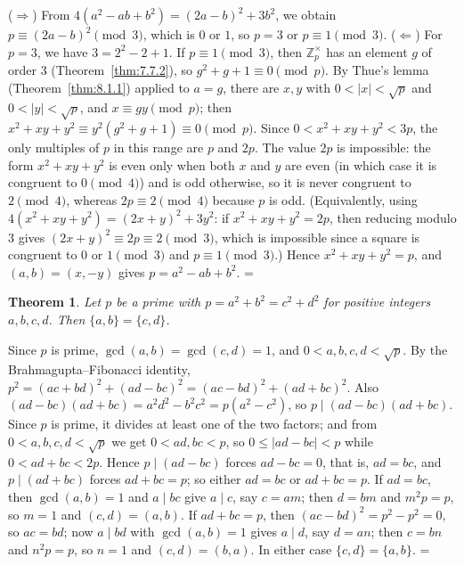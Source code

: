 \documentclass[11pt]{article}
\makeatletter
\let\nt@closedisplay\]
\def\nt@guardedclose{\@ifnextchar\par{\nt@closeafterpar}{\@ifnextchar\end{\postdisplaypenalty\@M\nt@closedisplay}{\nt@closedisplay}}}
\def\nt@closeafterpar\par{\@ifnextchar\par{\nt@closeafterpar}{\@ifnextchar\end{\postdisplaypenalty\@M\nt@closedisplay\par}{\nt@closedisplay\par}}}
\renewenvironment{proof}[1][\proofname]{\par
  \pushQED{\qed}\normalfont\topsep\medskipamount\edef\nt@afterproof{\@endparpenalty=\the\@endparpenalty\relax}\@beginparpenalty\@M\@endparpenalty\@M\let\]\nt@guardedclose\trivlist\item[]\textit{#1\@addpunct{.}} \ignorespaces}{\ifvmode\addpenalty\@M\fi\popQED\nt@afterproof\endtrivlist\@endpefalse}
\theoremstyle{ntstyle}
\newtheorem{theorem}{Theorem}[subsection]
\newcommand{\ZmodUnits}[1]{\mathbb{Z}_{#1}^{\times}}
\makeatother
\begin{document}
\begin{proof} ($\Rightarrow$) From $4(a^2 - ab + b^2) = (2a - b)^2 + 3b^2$, we obtain $p \equiv (2a - b)^2 \pmod{3}$, which is $0$ or
  $1$, so $p = 3$ or $p \equiv 1 \pmod{3}$. ($\Leftarrow$) For $p = 3$,
  we have $3 = 2^2 - 2 + 1$. If $p \equiv 1 \pmod{3}$, then
  $\ZmodUnits{p}$ has an element $g$ of order $3$ (Theorem~\ref{thm:7.7.2}), so $g^2 + g + 1 \equiv 0 \pmod{p}$. By
  Thue's lemma (Theorem~\ref{thm:8.1.1}) applied to
  $a = g$, there are $x, y$ with $0<|x|<\sqrt{p}$ and $0<|y|<\sqrt{p}$, and $x \equiv gy \pmod{p}$; then
  $x^2 + xy + y^2 \equiv y^2(g^2 + g + 1) \equiv 0 \pmod{p}$. Since $0 < x^2 + xy + y^2 < 3p$, the only multiples
  of $p$
  in this range are $p$ and $2p$. The value $2p$ is impossible: the
  form $x^2 + xy + y^2$ is even only when both $x$ and $y$ are even (in
  which case it is congruent to $0 \pmod{4}$) and is odd otherwise, so it is
  never congruent to $2 \pmod{4}$, whereas $2p \equiv 2 \pmod{4}$ because $p$
  is odd. (Equivalently, using $4(x^2 + xy + y^2) = (2x + y)^2 + 3y^2$:
  if $x^2 + xy + y^2 = 2p$, then reducing modulo $3$ gives $(2x + y)^2 \equiv 2p \equiv 2 \pmod{3}$, which is
  impossible since a square is congruent to $0$
  or $1 \pmod{3}$ and $p \equiv 1 \pmod{3}$.) Hence $x^2 + xy + y^2 = p$,
  and $(a, b) = (x, -y)$ gives $p = a^2 - ab + b^2$.
\end{proof}

\begin{theorem}\label{thm:8.1.7} Let $p$ be a prime with $p = a^2 + b^2 = c^2 + d^2$
  for positive integers $a, b, c, d$. Then $\{a, b\} = \{c, d\}$.

\end{theorem}

\begin{proof} Since $p$ is prime, $\gcd(a, b) = \gcd(c, d) = 1$, and $0 < a, b, c, d < \sqrt{p}$. By the
  Brahmagupta--Fibonacci identity, $p^2 = (ac + bd)^2 + (ad - bc)^2 = (ac - bd)^2 + (ad + bc)^2$. Also
  $(ad - bc)(ad + bc) = a^2 d^2 - b^2 c^2 = p(a^2 - c^2)$, so $p \mid (ad - bc)(ad + bc)$. Since $p$ is
  prime, it divides at least one of the two factors; and from $0 < a, b, c, d < \sqrt{p}$ we get $0 < ad, bc < p$,
  so $0 \le |ad - bc| < p$
  while $0 < ad + bc < 2p$. Hence $p \mid (ad - bc)$ forces $ad - bc = 0$, that is, $ad = bc$, and
  $p \mid (ad + bc)$ forces $ad + bc = p$; so
  either $ad = bc$ or $ad + bc = p$. If $ad = bc$, then $\gcd(a, b) = 1$ and
  $a \mid bc$ give $a \mid c$, say $c = am$; then $d = bm$ and $m^2 p = p$, so $m = 1$ and $(c, d) = (a, b)$. If
  $ad + bc = p$, then $(ac - bd)^2 = p^2 - p^2 = 0$, so $ac = bd$; now $a \mid bd$ with $\gcd(a, b)=1$
  gives $a \mid d$, say $d = an$; then $c = bn$ and $n^2 p = p$, so $n = 1$ and $(c, d) = (b, a)$. In either case
  $\{c, d\} = \{a, b\}$.
\end{proof}
\end{document}

